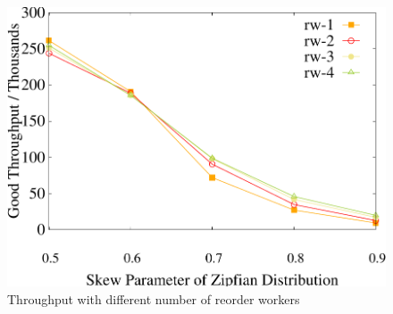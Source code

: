 \begin{figure}[t]
\begin{minipage}[b]{0.32\linewidth}
    \end{minipage}
    \begin{minipage}[b]{0.32\linewidth}
	\centering
	\includegraphics[width=\textwidth]{./exp_fig/reorder/tps}
	\vspace{-2em}
	\caption{Throughput with different number of reorder workers}
	\label{fig:reorder:tps}
	\end{minipage}    
    \vspace{-1em}
\end{figure}


